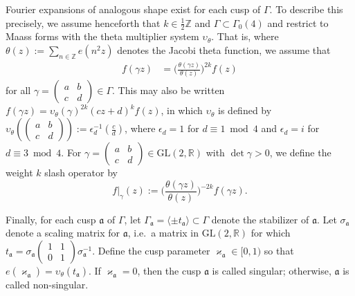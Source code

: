\documentclass[11pt,reqno]{amsart}
\theoremstyle{plain}
\theoremstyle{definition}
\numberwithin{equation}{section}
\begin{document}
Fourier expansions of analogous shape exist for each cusp of $\Gamma$. To describe this precisely, we assume henceforth that $k \in \frac{1}{2}\mathbb{Z}$ and $\Gamma \subset \Gamma_0(4)$ and restrict to %
Maass forms with the theta multiplier system $\upsilon_\theta$. That is, where $\theta(z) := \sum_{n \in \mathbb{Z}} e(n^2 z)$ denotes the Jacobi theta function, we assume that
\begin{align*}
	f(\gamma z) &= \Big(\frac{\theta(\gamma z)}{\theta(z)}\Big)^{2k} f(z) 
\end{align*}
for all $\gamma = (\begin{smallmatrix} a & b \\ c& d \end{smallmatrix}) \in \Gamma$. This may also be written $f(\gamma z) = \upsilon_\theta(\gamma)^{2k} (cz+d)^k f(z)$, in which $\upsilon_\theta$ is defined by $\upsilon_\theta((\begin{smallmatrix} a & b \\ c & d \end{smallmatrix})) := \epsilon_d^{-1}(\frac{c}{d})$, where $\epsilon_d =1$ for $d \equiv 1 \bmod 4$ and $\epsilon_d = i$ for $d \equiv 3 \bmod 4$. For $\gamma  = (\begin{smallmatrix} a & b \\ c& d \end{smallmatrix}) \in \mathrm{GL}(2,\mathbb{R})$ with $\det \gamma > 0$, we define the weight $k$ slash operator by
\[
	f\vert_{\gamma}(z) := \Big(\frac{\theta(\gamma z)}{\theta(z)}\Big)^{-2k} f(\gamma z).
\]

Finally, for each cusp $\mathfrak{a}$ of $\Gamma$, let $\Gamma_\mathfrak{a} = \langle \pm t_\mathfrak{a} \rangle \subset \Gamma$ denote the stabilizer of $\mathfrak{a}$.  Let $\sigma_{\mathfrak{a}}$ denote a scaling matrix for $\mathfrak{a}$, i.e.\ a matrix in $\mathrm{GL}(2,\mathbb{R})$ for which $t_\mathfrak{a} = \sigma_\mathfrak{a} (\begin{smallmatrix} 1 & 1 \\ 0 & 1 \end{smallmatrix}) \sigma_{\mathfrak{a}}^{-1}$. Define the cusp parameter $\varkappa_\mathfrak{a} \in [0,1)$ so that $e(\varkappa_\mathfrak{a}) = \upsilon_\theta(t_\mathfrak{a})$. If $\varkappa_\mathfrak{a} = 0$, then the cusp $\mathfrak{a}$ is called singular; otherwise, $\mathfrak{a}$ is called non-singular.
\end{document}
